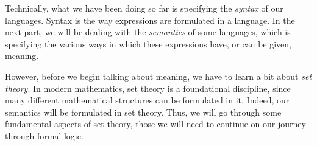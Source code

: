 Technically, what we have been doing so far is specifying the \textit{syntax} of our languages. Syntax is the way expressions are formulated in a language. In the next part, we will be dealing with the \textit{semantics} of some languages, which is specifying the various ways in which these expressions have, or can be given, meaning. 

However, before we begin talking about meaning, we have to learn a bit about \textit{set theory}. In modern mathematics, set theory is a foundational discipline, since many different mathematical structures can be formulated in it. Indeed, our semantics will be formulated in set theory. Thus, we will go through some fundamental aspects of set theory, those we will need to continue on our journey through formal logic. 